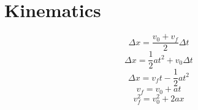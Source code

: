\documentclass[twocolumn]{article}
\begin{document}
\section*{Kinematics}
$$\Delta x=\frac{v_0+v_f}{2}\Delta t$$
$$\Delta x=\frac{1}{2}at^2+v_0\Delta t$$
$$\Delta x=v_ft-\frac{1}{2}at^2$$
$$v_f=v_0+at$$
$$v_f^2=v_0^2+2ax$$
\end{document}
